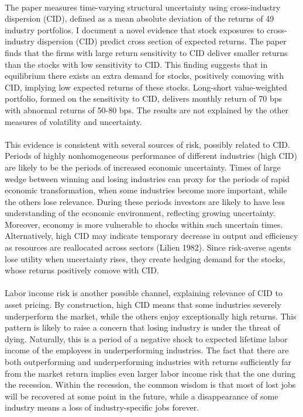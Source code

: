 \documentclass[12pt]{article}
\begin{document}
\paragraph{}
The paper measures time-varying structural uncertainty using cross-industry dispersion (CID), defined as a mean absolute deviation of the returns of 49 industry portfolios. I document a novel evidence that stock exposures to cross-industry dispersion (CID) predict cross section of expected returns. The paper finds that the firms with large return sensitivity to CID deliver smaller returns than the stocks with low sensitivity to CID. This finding suggests that in equilibrium there exists an extra demand for stocks, positively comoving with CID, implying low expected returns of these stocks. Long-short value-weighted portfolio, formed on the sensitivity to CID, delivers monthly return of 70 bps with abnormal returns of 50-80 bps. The results are not explained by the other measures of volatility and uncertainty.
\paragraph{}
This evidence is consistent with several sources of risk, possibly related to CID. Periods of highly nonhomogeneous performance of different industries (high CID) are likely to be the periods of increased economic uncertainty. Times of large wedge between winning and losing industries can proxy for the periods of rapid economic transformation, when some industries become more important, while the others lose relevance. During these periods investors are likely to have less understanding of the economic environment, reflecting growing uncertainty. Moreover, economy is more vulnerable to shocks within such uncertain times. Alternatively, high CID may indicate temporary decrease in output and efficiency as resources are reallocated across sectors (Lilien 1982). Since risk-averse agents lose utility when uncertainty rises, they create hedging demand for the stocks, whose returns positively comove with CID.
\paragraph{}
Labor income risk is another possible channel, explaining relevance of CID to asset pricing. By construction, high CID means that some industries severely underperform the market, while the others enjoy exceptionally high returns. This pattern is likely to raise a concern that losing industry is under the threat of dying. Naturally, this is a period of a negative shock to expected lifetime labor income of the employees in underperforming industries. The fact that there are both outperforming and underperforming industries with returns sufficiently far from the market return implies even larger labor income risk that the one during the recession. Within the recession, the common wisdom is that most of lost jobs will be recovered at some point in the future, while a disappearance of some industry means a loss of industry-specific jobs forever. 
\end{document}
